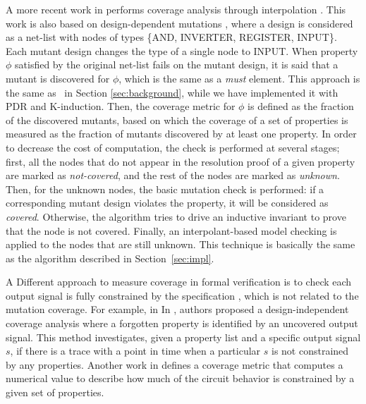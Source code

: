 A more recent work in \cite{chockler2010coverage} performs coverage analysis through interpolation \cite{mcmillan2003interpolation}. This work is also based on design-dependent mutations \cite{chockler_coverage_2003}, where a design is considered as a net-list with nodes of types \{AND, INVERTER, REGISTER, INPUT\}. Each mutant design changes the type of a single node to INPUT. When property $\phi$ satisfied by the original net-list fails on the mutant design, it is said that a mutant is discovered for $\phi$, which is the same as a \emph{must} element. This approach is the same as \nondetcov\ in Section \ref{sec:background}, while we have implemented it with PDR and K-induction.
Then, the coverage metric for $\phi$ is defined as the fraction of the discovered mutants, based on which the coverage of a set of properties is measured as the fraction of mutants discovered by at least one property.
In order to decrease the cost of computation, the check is performed at several stages; first, all the nodes that do not appear in the resolution proof of a given property are marked as \emph{not-covered}, and the rest of the nodes are marked as \emph{unknown}. Then, for the unknown nodes, the basic mutation check is performed: if a corresponding mutant design violates the property, it will be considered as \emph{covered}. Otherwise, the algorithm tries to drive an inductive invariant to prove that the node is not covered. Finally, an interpolant-based model checking is applied to the nodes that are still unknown. This technique is basically the same as the \mustalg algorithm described in Section~\ref{sec:impl}.

A Different approach to measure coverage in formal verification is to check each output signal is fully constrained by the specification \cite{das2005formal, claessen2007coverage, grosse2007estimating}, which is not related to the mutation coverage. For example, in In \cite{claessen2007coverage}, authors proposed a design-independent coverage analysis where a forgotten property is identified by an uncovered output signal. This method investigates, given a property list and a specific output signal $s$, if there is a trace with a point in time when a particular $s$ is not constrained by any properties. Another work in \cite{haedicke2012guiding} defines a coverage metric that computes a numerical value to describe how much of the circuit behavior is constrained by a given set of properties.


